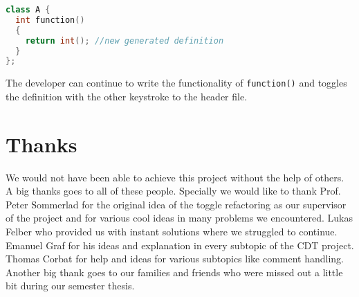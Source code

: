 \begin{lstlisting}[caption={Situation after quick implement},
label={beforeimpl}, language=C++]
class A {
  int function()
  {
    return int(); //new generated definition
  }
};
\end{lstlisting}

The developer can continue to write the functionality of \texttt{function()}
and toggles the definition with the other keystroke to the header file.

\thispagestyle{empty}
\pagebreak

\chapter*{Thanks}
We would not have been able to achieve this project without the help of others.
A big thanks goes to all of these people.\newline
Specially we would like to thank Prof. Peter Sommerlad for the original idea
of the toggle refactoring as our supervisor of the project and for various cool
ideas in many problems we encountered. Lukas Felber who provided us with
instant solutions where we struggled to continue. Emanuel Graf for his ideas and
explanation in every subtopic of the CDT project. Thomas Corbat for help and
ideas for various subtopics like comment handling. \newline
Another big thank goes to our families and friends who were missed out a little
bit during our semester thesis.
\thispagestyle{empty}

